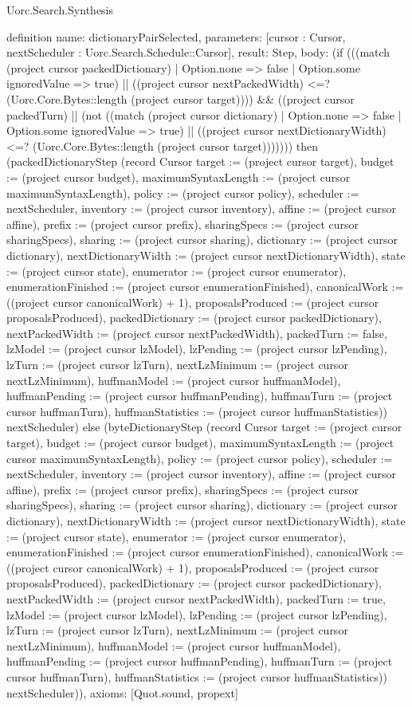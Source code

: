 \begin{lexlean}{Uorc.Search.Synthesis}
\begin{semanticmodule}
definition{
  name: dictionaryPairSelected,
  parameters: [cursor : Cursor, nextScheduler : Uorc.Search.Schedule::Cursor],
  result: Step,
  body: (if (((match (project cursor packedDictionary)
    | Option.none => false
    | Option.some ignoredValue => true) || ((project cursor nextPackedWidth) <=? (Uorc.Core.Bytes::length (project cursor target)))) && ((project cursor packedTurn) || (not ((match (project cursor dictionary)
    | Option.none => false
    | Option.some ignoredValue => true) || ((project cursor nextDictionaryWidth) <=? (Uorc.Core.Bytes::length (project cursor target))))))) then (packedDictionaryStep (record Cursor {target := (project cursor target), budget := (project cursor budget), maximumSyntaxLength := (project cursor maximumSyntaxLength), policy := (project cursor policy), scheduler := nextScheduler, inventory := (project cursor inventory), affine := (project cursor affine), prefix := (project cursor prefix), sharingSpecs := (project cursor sharingSpecs), sharing := (project cursor sharing), dictionary := (project cursor dictionary), nextDictionaryWidth := (project cursor nextDictionaryWidth), state := (project cursor state), enumerator := (project cursor enumerator), enumerationFinished := (project cursor enumerationFinished), canonicalWork := ((project cursor canonicalWork) + 1), proposalsProduced := (project cursor proposalsProduced), packedDictionary := (project cursor packedDictionary), nextPackedWidth := (project cursor nextPackedWidth), packedTurn := false, lzModel := (project cursor lzModel), lzPending := (project cursor lzPending), lzTurn := (project cursor lzTurn), nextLzMinimum := (project cursor nextLzMinimum), huffmanModel := (project cursor huffmanModel), huffmanPending := (project cursor huffmanPending), huffmanTurn := (project cursor huffmanTurn), huffmanStatistics := (project cursor huffmanStatistics)}) nextScheduler) else (byteDictionaryStep (record Cursor {target := (project cursor target), budget := (project cursor budget), maximumSyntaxLength := (project cursor maximumSyntaxLength), policy := (project cursor policy), scheduler := nextScheduler, inventory := (project cursor inventory), affine := (project cursor affine), prefix := (project cursor prefix), sharingSpecs := (project cursor sharingSpecs), sharing := (project cursor sharing), dictionary := (project cursor dictionary), nextDictionaryWidth := (project cursor nextDictionaryWidth), state := (project cursor state), enumerator := (project cursor enumerator), enumerationFinished := (project cursor enumerationFinished), canonicalWork := ((project cursor canonicalWork) + 1), proposalsProduced := (project cursor proposalsProduced), packedDictionary := (project cursor packedDictionary), nextPackedWidth := (project cursor nextPackedWidth), packedTurn := true, lzModel := (project cursor lzModel), lzPending := (project cursor lzPending), lzTurn := (project cursor lzTurn), nextLzMinimum := (project cursor nextLzMinimum), huffmanModel := (project cursor huffmanModel), huffmanPending := (project cursor huffmanPending), huffmanTurn := (project cursor huffmanTurn), huffmanStatistics := (project cursor huffmanStatistics)}) nextScheduler)),
  axioms: [Quot.sound, propext]
}


\end{semanticmodule}
\end{lexlean}
